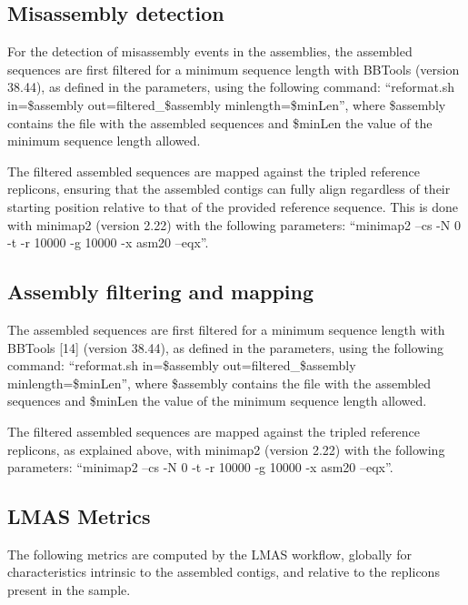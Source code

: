\subsection{Misassembly detection} \label{chap5_sup_misassembly}

For the detection of misassembly events in the assemblies, the assembled sequences are first filtered for a minimum sequence length with BBTools \cite{bushnell_bbmerge_2017} (version 38.44), as defined in the parameters, using the following command: “reformat.sh in=\$assembly out=filtered\_\$assembly minlength=\$minLen”, where \$assembly contains the file with the assembled sequences and \$minLen the value of the minimum sequence length allowed. 

The filtered assembled sequences are mapped against the tripled reference replicons, ensuring that the assembled contigs can fully align regardless of their starting position relative to that of the provided reference sequence. This is done with minimap2 \cite{li_minimap2_2018} (version 2.22) with the following parameters: “minimap2 --cs -N 0 -t -r 10000 -g 10000 -x asm20 --eqx”.

\subsection{Assembly filtering and mapping} \label{ch5_sup_assembly_filtering_and_mapping}

The assembled sequences are first filtered for a minimum sequence length with BBTools [14] (version 38.44), as defined in the parameters, using the following command: “reformat.sh in=\$assembly out=filtered\_\$assembly minlength=\$minLen”, where \$assembly contains the file with the assembled sequences and \$minLen the value of the minimum sequence length allowed. 

The filtered assembled sequences are mapped against the tripled reference replicons, as explained above, with minimap2 \cite{li_minimap2_2018} (version 2.22) with the following parameters: “minimap2 --cs -N 0 -t -r 10000 -g 10000 -x asm20 --eqx”.

\subsection{LMAS Metrics} \label{ch5_supmaterial_metrics}

The following metrics are computed by the LMAS workflow, globally for characteristics intrinsic to the assembled contigs, and relative to the replicons present in the sample. 

